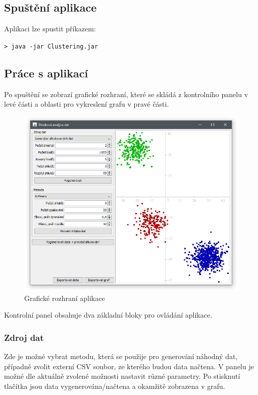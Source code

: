 \documentclass[pdftex,a4paper]{article}
\begin{document}
\subsection{Spuštění aplikace}
Aplikaci lze spustit příkazem:

\vspace{2mm}
\texttt{> java -jar Clustering.jar}


\subsection{Práce s aplikací}\label{subsec:prace-s-aplikace}
Po spuštění se zobrazí grafické rozhraní, které se skládá z kontrolního panelu v levé části a oblasti pro vykreslení grafu v pravé části.


\begin{figure}[h]
	\centering
	\includegraphics[width=1\textwidth]{res/gui.png}
	\caption{Grafické rozhraní aplikace}
	\label{fig:obr-gui}
\end{figure}


Kontrolní panel obsahuje dva základní bloky pro ovládání aplikace.

\subsubsection*{Zdroj dat}
Zde je možné vybrat metodu, která se použije pro generování náhodný dat, případně zvolit externí CSV soubor, ze kterého budou data načtena. V panelu je možné dle aktuálně zvolené možnosti nastavit různé parametry. Po stisknutí tlačítka jsou data vygenerována/načtena a okamžitě zobrazena v grafu.
\end{document}

